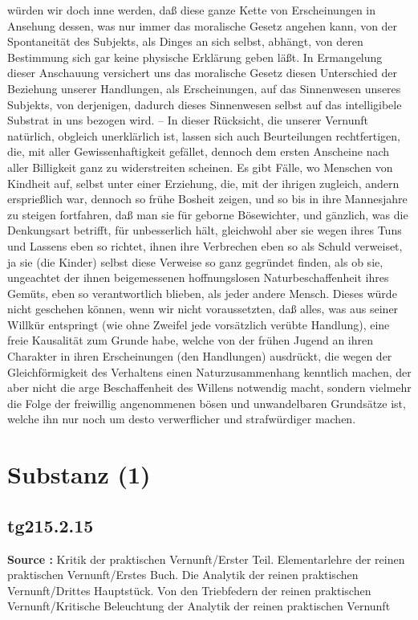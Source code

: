 \documentclass[a4paper,12pt,twoside]{book}
\newcommand{\unnumberedsection}[1]{
	\section*{#1}
	\addcontentsline{toc}{section}{#1}
	\markright{#1}
}
\begin{document}
würden wir doch inne werden, daß diese ganze Kette von Erscheinungen in Ansehung dessen, was nur immer das moralische Gesetz angehen kann, von der Spontaneität des Subjekts, als Dinges an sich selbst, abhängt, von deren Bestimmung sich gar keine physische Erklärung geben läßt. In Ermangelung dieser Anschauung versichert uns das moralische Gesetz diesen Unterschied der Beziehung unserer Handlungen, als Erscheinungen, auf das Sinnenwesen unseres Subjekts, von derjenigen, dadurch dieses Sinnenwesen selbst auf das intelligibele Substrat in uns bezogen wird. – In dieser Rücksicht, die unserer Vernunft natürlich, obgleich unerklärlich ist, lassen sich auch Beurteilungen rechtfertigen, die, mit aller Gewissenhaftigkeit gefället, dennoch dem ersten Anscheine nach aller Billigkeit ganz zu widerstreiten scheinen. Es gibt Fälle, wo Menschen von Kindheit auf, selbst unter einer Erziehung, die, mit der ihrigen zugleich, andern ersprießlich war, dennoch so frühe Bosheit zeigen, und so bis in ihre Mannesjahre zu steigen fortfahren, daß man sie für geborne Bösewichter, und gänzlich, was die Denkungsart betrifft, für unbesserlich hält, gleichwohl aber sie wegen ihres Tuns und Lassens eben so richtet, ihnen ihre Verbrechen eben so als Schuld verweiset, ja sie (die Kinder) selbst diese Verweise so ganz gegründet  finden, als ob sie, ungeachtet der ihnen beigemessenen hoffnungslosen Naturbeschaffenheit ihres Gemüts, eben so verantwortlich blieben, als jeder andere Mensch. Dieses würde nicht geschehen können, wenn wir nicht voraussetzten, daß alles, was aus seiner Willkür entspringt (wie ohne Zweifel jede vorsätzlich verübte Handlung), eine freie Kausalität zum Grunde habe, welche von der frühen Jugend an ihren Charakter in ihren Erscheinungen (den Handlungen) ausdrückt, die wegen der Gleichförmigkeit des Verhaltens einen Naturzusammenhang kenntlich machen, der aber nicht die arge Beschaffenheit des Willens notwendig macht, sondern vielmehr die Folge der freiwillig angenommenen bösen und unwandelbaren Grundsätze ist, welche ihn nur noch um desto verwerflicher und strafwürdiger machen. 
	
	\unnumberedsection{Substanz (1)} 
	\subsection*{tg215.2.15} 
	\textbf{Source : }Kritik der praktischen Vernunft/Erster Teil. Elementarlehre der reinen praktischen Vernunft/Erstes Buch. Die Analytik der reinen praktischen Vernunft/Drittes Hauptstück. Von den Triebfedern der reinen praktischen Vernunft/Kritische Beleuchtung der Analytik der reinen praktischen Vernunft\\  
	
\end{document}
